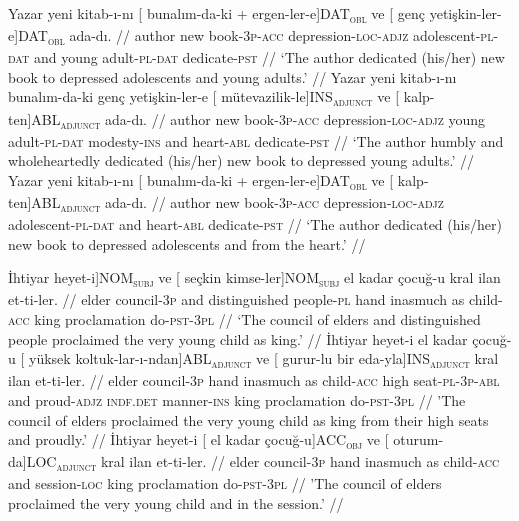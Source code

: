 \pex[exno=TS7,glspace=!1em,everygla={},everyglb={},aboveglbskip=-.15ex, interpartskip=15pt]
\label{TS7-case}
\a
\begingl
\gla Yazar yeni kitab-ı-nı {[} bunalım-da-ki + ergen-ler-e{]}DAT\textsubscript{\textsc{obl}} ve {[} genç yetişkin-ler-e{]}DAT\textsubscript{\textsc{obl}} ada-dı. //
\glb author new book-\textsc{3p}-\textsc{acc} depression-\textsc{loc}-\textsc{adjz} adolescent-\textsc{pl}-\textsc{dat} and young adult-\textsc{pl}-\textsc{dat} dedicate-\textsc{pst} //
\glft `The author dedicated (his/her) new book to depressed adolescents and young adults.' //
\endgl
\a
\begingl
\gla Yazar yeni kitab-ı-nı bunalım-da-ki genç yetişkin-ler-e {[} mütevazilik-le{]}INS\textsubscript{\textsc{adjunct}} ve {[} kalp-ten{]}ABL\textsubscript{\textsc{adjunct}} ada-dı. //
\glb author new book-\textsc{3p}-\textsc{acc} depression-\textsc{loc}-\textsc{adjz} young adult-\textsc{pl}-\textsc{dat} modesty-\textsc{ins} and heart-\textsc{abl} dedicate-\textsc{pst} //
\glft `The author humbly and wholeheartedly dedicated (his/her) new book to depressed young adults.' //
\endgl
\a
\begingl
\gla Yazar yeni kitab-ı-nı {[} bunalım-da-ki +  ergen-ler-e{]}DAT\textsubscript{\textsc{obl}} ve {[} kalp-ten{]}ABL\textsubscript{\textsc{adjunct}} ada-dı. //
\glb author new book-\textsc{3p}-\textsc{acc} depression-\textsc{loc}-\textsc{adjz}  adolescent-\textsc{pl}-\textsc{dat} and heart-\textsc{abl} dedicate-\textsc{pst} //
\glft `The author dedicated (his/her) new book to depressed adolescents and from the heart.' //
\endgl
\xe

\pex[exno=TS8,glspace=!1em,everygla={},everyglb={},aboveglbskip=-.15ex, interpartskip=15pt]
\label{TS8-case}
\a
\begingl
\gla {[} İhtiyar heyet-i{]}NOM\textsubscript{\textsc{subj}} ve {[} seçkin kimse-ler{]}NOM\textsubscript{\textsc{subj}} el kadar çocuğ-u kral ilan et-ti-ler. //
\glb elder council-\textsc{3p} and distinguished people-\textsc{pl} hand {inasmuch as} child-\textsc{acc} king proclamation do-\textsc{pst}-\textsc{3pl} //
\glft `The council of elders and distinguished people proclaimed the very young child as king.' //
\endgl
\a
\begingl
\gla İhtiyar heyet-i el kadar çocuğ-u {[} yüksek koltuk-lar-ı-ndan{]}ABL\textsubscript{\textsc{adjunct}} ve {[} gurur-lu bir eda-yla{]}INS\textsubscript{\textsc{adjunct}} kral ilan et-ti-ler. //
\glb elder council-\textsc{3p} hand {inasmuch as} child-\textsc{acc} high seat-\textsc{pl}-\textsc{3p}-\textsc{abl} and proud-\textsc{adjz} \textsc{indf.det} manner-\textsc{ins} king proclamation do-\textsc{pst}-\textsc{3pl} //
\glft 'The council of elders proclaimed the very young child as king from their high seats and proudly.' //
\endgl
\a
\begingl
\gla İhtiyar heyet-i {[} el kadar çocuğ-u{]}ACC\textsubscript{\textsc{obj}} ve {[} oturum-da{]}LOC\textsubscript{\textsc{adjunct}} kral ilan et-ti-ler. //
\glb elder council-\textsc{3p} hand {inasmuch as} child-\textsc{acc} and session-\textsc{loc} king proclamation do-\textsc{pst}-\textsc{3pl}  //
\glft 'The council of elders proclaimed the very young child and in the session.' //
\endgl
\xe


